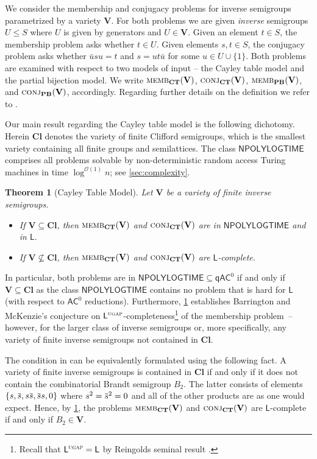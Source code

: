\documentclass[anonymous,letter,UKenglish,cleveref,autoref,thm-restate]{lipics-v2021}
\renewcommand{\leq}{\leqslant}
\newcommand{\sse}{\subseteq}
\newcommand{\bigO}{\mathcal{O}}
\newcommand{\NPOLYLOGTIME}{\ensuremath{\mathsf{NPOLYLOGTIME}}\xspace}
\newcommand{\ACz}{\ensuremath{\mathsf{AC}^0}\xspace}
\newcommand{\qACz}{\ensuremath{\mathsf{qAC}^0}\xspace}
\newcommand{\LOGSPACE}{\ensuremath{\mathsf{L}}\xspace}
\newcommand{\vV}{\ensuremath{\mathbf{V}}}
\newcommand{\vCl}{\ensuremath{\mathbf{Cl}}}
\newcommand\nindent{.5pt}
\newcommand\noverline[1]{\kern\nindent\overline{\kern-\nindent#1\kern-\nindent}\kern\nindent}
\newcommand{\ov}[1]{\noverline{#1}}
\theoremstyle{plain}
\theoremstyle{plain}
\newtheorem{maintheorem}{Theorem}
\newcommand{\dMemb}[2][]{\textup{\textsc{memb${}_{\mathbf{#1}}\expandafter\ifx\expandafter\relax\detokenize{#2}\relax\else(#2)\fi$}}}
\newcommand{\dConj}[2][]{\textup{\textsc{conj${}_{\mathbf{#1}}\expandafter\ifx\expandafter\relax\detokenize{#2}\relax\else(#2)\fi$}}}
\newcommand{\prob}[1]{\textup{\textsc{#1}}\xspace}
\newcommand{\dUGAP}{\prob{ugap}}
\begin{document}
We consider the membership and conjugacy problems for inverse semigroups parametrized by a variety $\vV$.
For both problems we are given \emph{inverse} semigroups $U\leq S$ where $U$ is given by generators and $U \in \vV$.
Given an element $t \in S$, the membership problem asks whether $t \in U$.
Given elements $s, t \in S$, the conjugacy problem asks whether $\bar u s u = t$ and $s = u t \bar u$ for some $u\in U \cup \{1\}$.
Both problems are examined with respect to two models of input -- the Cayley table model and the partial bijection model.
We write $\dMemb[CT]{\vV}$, $\dConj[CT]{\vV}$, $\dMemb[PB]{\vV}$, and $\dConj[PB]{\vV}$, accordingly.
Regarding further details on the definition we refer to .

Our main result regarding the Cayley table model is the following dichotomy.
Herein $\vCl$ denotes the variety of finite Clifford semigroups, which is the smallest variety containing all finite groups and semilattices.
The class \NPOLYLOGTIME comprises all problems solvable by non-deterministic random access Turing machines in time $\log^{\bigO(1)} n$; see \cref{sec:complexity}.

\begin{maintheorem}[Cayley Table Model]\label{thm:main-CT}
	Let $\vV$ be a variety of finite inverse semigroups. 
	\begin{itemize}
		\item If $\vV \sse \vCl$, then $\dMemb[CT]{\vV}$ and $\dConj[CT]{\vV}$ are in \NPOLYLOGTIME and in \LOGSPACE.
		\item If $\vV \not\sse \vCl$, then $\dMemb[CT]{\vV}$ and $\dConj[CT]{\vV}$ are \LOGSPACE-complete.
	\end{itemize}
\end{maintheorem}

In particular, both problems are in $\NPOLYLOGTIME \sse \qACz$ if and only if $\vV \sse \vCl$ as the class $\NPOLYLOGTIME$ contains no problem that is hard for $\LOGSPACE$ (with respect to $\ACz$ reductions).
Furthermore, \cref{thm:main-CT} establishes Barrington and McKenzie's conjecture \cite{BarringtonM91} on $\LOGSPACE^\dUGAP$-completeness\footnote{Recall that $\LOGSPACE^\dUGAP = \LOGSPACE$ by Reingolds seminal result \cite{Reingold08}.} of the membership problem~-- however, for the larger class of inverse semigroups or, more specifically, any variety of finite inverse semigroups not contained in $\vCl$.

The condition in  can be equivalently formulated using the following fact.
A variety of finite inverse semigroups is contained in $\vCl$ if and only if it does not contain the combinatorial Brandt semigroup $B_2$.
The latter consists of elements $\{s,\ov s, s\ov s, \ov s s, 0\}$ where $s^2 = \ov s^2 = 0$ and all of the other products are as one would expect.
Hence, by \cref{thm:main-CT}, the problems $\dMemb[CT]{\vV}$ and $\dConj[CT]{\vV}$ are \LOGSPACE-complete if and only if $B_2 \in \vV$.
\end{document}
